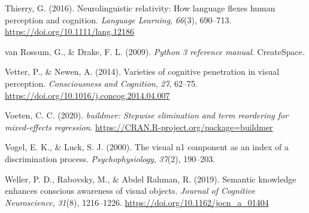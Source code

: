 \documentclass[
  english,
  man,11pt,floatsintext]{apa7}
\begin{document}
\leavevmode\hypertarget{ref-thierry2016}{}%
Thierry, G. (2016). Neurolinguistic relativity: How language flexes human perception and cognition. \emph{Language Learning}, \emph{66}(3), 690--713. \url{https://doi.org/10.1111/lang.12186}

\leavevmode\hypertarget{ref-vanrossum2009}{}%
van Rossum, G., \& Drake, F. L. (2009). \emph{Python 3 reference manual}. CreateSpace.

\leavevmode\hypertarget{ref-vetter2014}{}%
Vetter, P., \& Newen, A. (2014). Varieties of cognitive penetration in visual perception. \emph{Consciousness and Cognition}, \emph{27}, 62--75. \url{https://doi.org/10.1016/j.concog.2014.04.007}

\leavevmode\hypertarget{ref-R-buildmer}{}%
Voeten, C. C. (2020). \emph{buildmer: Stepwise elimination and term reordering for mixed-effects regression}. \url{https://CRAN.R-project.org/package=buildmer}

\leavevmode\hypertarget{ref-vogel2000}{}%
Vogel, E. K., \& Luck, S. J. (2000). The visual n1 component as an index of a discrimination process. \emph{Psychophysiology}, \emph{37}(2), 190--203.

\leavevmode\hypertarget{ref-weller2019}{}%
Weller, P. D., Rabovsky, M., \& Abdel Rahman, R. (2019). Semantic knowledge enhances conscious awareness of visual objects. \emph{Journal of Cognitive Neuroscience}, \emph{31}(8), 1216--1226. \url{https://doi.org/10.1162/jocn_a_01404}
\end{document}
